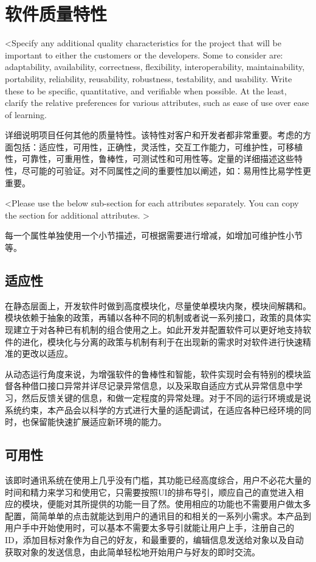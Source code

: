 \chapter{软件质量特性}

<Specify any additional quality characteristics for the project that will be important to either the customers or the developers. Some to consider are: adaptability, availability, correctness, flexibility, interoperability, maintainability, portability, reliability, reusability, robustness, testability, and usability. Write these to be specific, quantitative, and verifiable when possible. At the least, clarify the relative preferences for various attributes, such as ease of use over ease of learning.

详细说明项目任何其他的质量特性。该特性对客户和开发者都非常重要。考虑的方面包括：适应性，可用性，正确性，灵活性，交互工作能力，可维护性，可移植性，可靠性，可重用性，鲁棒性，可测试性和可用性等。定量的详细描述这些特性，尽可能的可验证。对不同属性之间的重要性加以阐述，如：易用性比易学性更重要。

<Please use the below sub-section for each attributes separately. You can copy the section for additional attributes. >

每一个属性单独使用一个小节描述，可根据需要进行增减，如增加可维护性小节等。

\section{适应性}
在静态层面上，开发软件时做到高度模块化，尽量使单模块内聚，模块间解耦和。模块依赖于抽象的政策，再辅以各种不同的机制或者说一系列接口，政策的具体实现建立于对各种已有机制的组合使用之上。如此开发并配置软件可以更好地支持软件的进化，模块化与分离的政策与机制有利于在出现新的需求时对软件进行快速精准的更改以适应。

从动态运行角度来说，为增强软件的鲁棒性和智能，软件实现时会有特别的模块监督各种借口接口异常并详尽记录异常信息，以及采取自适应方式从异常信息中学习，然后反馈关键的信息，和做一定程度的异常处理。对于不同的运行环境或是说系统约束，本产品会以科学的方式进行大量的适配调试，在适应各种已经环境的同时，也保留能快速扩展适应新环境的能力。

\section{可用性}
该即时通讯系统在使用上几乎没有门槛，其功能已经高度综合，用户不必花大量的时间和精力来学习和使用它，只需要按照UI的排布导引，顺应自己的直觉进入相应的模块，便能对其所提供的功能一目了然。使用相应的功能也不需要用户做太多配置，简简单单的点击就能达到用户的通讯目的和相关的一系列小需求。本产品到用户手中开始使用时，可以基本不需要太多导引就能让用户上手，注册自己的ID，添加目标对象作为自己的好友，和最重要的，编辑信息发送给对象以及自动获取对象的发送信息，由此简单轻松地开始用户与好友的即时交流。

